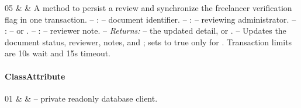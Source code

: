 \begin{ClassMethodTable}
05 & \newline{}\newline{}\newline{} &
A method to persist a review and synchronize the freelancer verification flag in one transaction.
\newline -- :  -- document identifier.
\newline -- :  -- reviewing administrator.
\newline -- :  --  or .
\newline -- :  -- reviewer note.
\newline -- \textit{Returns:}  -- the updated detail, or .
\newline -- Updates the document status, reviewer, notes, and ; sets  to true only for . Transaction limits are 10s wait and 15s timeout. \\ \hline
\end{ClassMethodTable}

\paragraph{ClassAttribute}
\begin{ClassAttributeTable}
01 &  &  -- private readonly database client. \\ \hline
\end{ClassAttributeTable}